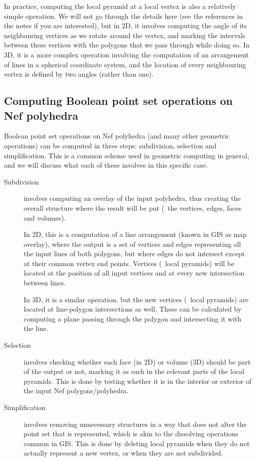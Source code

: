 In practice, computing the local pyramid at a local vertex is also a relatively simple operation.
We will not go through the details here (see the references in the notes if you are interested), but in 2D, it involves computing the angle of its neighbouring vertices as we rotate around the vertex, and marking the intervals between these vertices with the polygons that we pass through while doing so.
In 3D, it is a more complex operation involving the computation of an arrangement of lines in a spherical coordinate system, and the location of every neighbouring vertex is defined by two angles (rather than one).

\subsection{Computing Boolean point set operations on Nef polyhedra}

Boolean point set operations on Nef polyhedra (and many other geometric operations) can be computed in three steps: subdivision, selection and simplification.
This is a common scheme used in geometric computing in general, and we will discuss what each of these involves in this specific case.

\begin{description}

\item[Subdivision] involves computing an overlay of the input polyhedra, thus creating the overall structure where the result will be put (\ie\ the vertices, edges, faces and volumes).

In 2D, this is a computation of a line arrangement (known in GIS as map overlay), where the output is a set of vertices and edges representing all the input lines of both polygons, but where edges do not intersect except at their common vertex end points.
Vertices (\ie\ local pyramids) will be located at the position of all input vertices and at every new intersection between lines.

In 3D, it is a similar operation, but the new vertices (\ie\ local pyramids) are located at line-polygon intersections as well.
These can be calculated by computing a plane passing through the polygon and intersecting it with the line.

\item[Selection] involves checking whether each face (in 2D) or volume (3D) should be part of the output or not, marking it as such in the relevant parts of the local pyramids.
This is done by testing whether it is in the interior or exterior of the input Nef polygons/polyhedra.

\item[Simplification] involves removing unnecessary structures in a way that does not alter the point set that is represented, which is akin to the dissolving operations common in GIS\@.
This is done by deleting local pyramids when they do not actually represent a new vertex, or when they are not subdivided.

\end{description}

